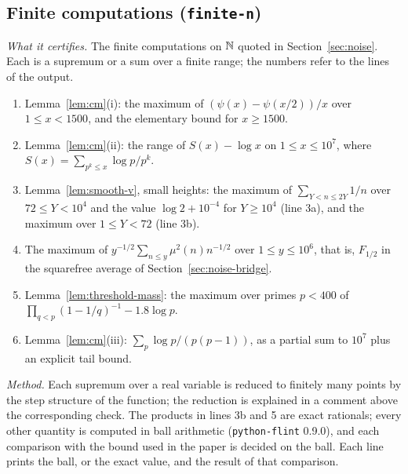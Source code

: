 \subsection{Finite computations (\texttt{finite-n})}\label{app:cert-finite}
\emph{What it certifies.} The finite computations on $\mathbb{N}$ quoted in Section~\ref{sec:noise}. Each is a supremum or a sum over a
finite range; the numbers refer to the lines of the output.
\begin{enumerate}[label=\arabic*.,leftmargin=*]
\item Lemma~\ref{lem:cm}(i): the maximum of $(\psi(x)-\psi(x/2))/x$ over $1\le x<1500$, and the elementary bound for $x\ge1500$.
\item Lemma~\ref{lem:cm}(ii): the range of $S(x)-\log x$ on $1\le x\le10^7$, where $S(x)=\sum_{p^k\le x}\log p/p^k$.
\item Lemma~\ref{lem:smooth-v}, small heights: the maximum of $\sum_{Y<n\le2Y}1/n$ over $72\le Y<10^4$ and the value
$\log2+10^{-4}$ for $Y\ge10^4$ (line 3a), and the maximum over $1\le Y<72$ (line 3b).
\item The maximum of $y^{-1/2}\sum_{n\le y}\mu^2(n)n^{-1/2}$ over $1\le y\le10^6$, that is, $F_{1/2}$ in the squarefree average of
Section~\ref{sec:noise-bridge}.
\item Lemma~\ref{lem:threshold-mass}: the maximum over primes $p<400$ of $\prod_{q<p}(1-1/q)^{-1}-1.8\log p$.
\item Lemma~\ref{lem:cm}(iii): $\sum_p\log p/(p(p-1))$, as a partial sum to $10^7$ plus an explicit tail bound.
\end{enumerate}
\emph{Method.} Each supremum over a real variable is reduced to finitely many points by the step structure of the function; the
reduction is explained in a comment above the corresponding check.
The products in lines 3b and 5 are exact rationals; every other quantity is computed in ball arithmetic
(\texttt{python-flint} 0.9.0), and each comparison with the bound used in the paper is decided on the ball. Each line prints
the ball, or the exact value, and the result of that comparison.

